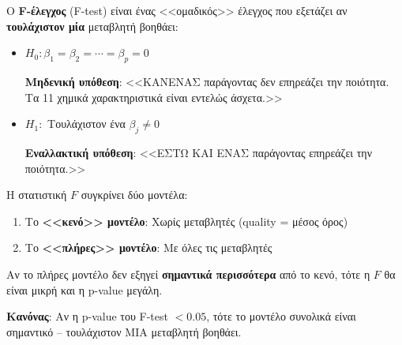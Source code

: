 \documentclass[12pt,a4paper]{article}
\begin{document}
\begin{theorybox}
Ο \textbf{F-έλεγχος} (F-test) είναι ένας <<ομαδικός>> έλεγχος που εξετάζει αν \textbf{τουλάχιστον μία} μεταβλητή βοηθάει:

\begin{itemize}
    \item $H_0: \beta_1 = \beta_2 = \cdots = \beta_p = 0$

    \textbf{Μηδενική υπόθεση}: <<ΚΑΝΕΝΑΣ παράγοντας δεν επηρεάζει την ποιότητα. Τα 11 χημικά χαρακτηριστικά είναι εντελώς άσχετα.>>

    \item $H_1:$ Τουλάχιστον ένα $\beta_j \neq 0$

    \textbf{Εναλλακτική υπόθεση}: <<ΕΣΤΩ ΚΑΙ ΕΝΑΣ παράγοντας επηρεάζει την ποιότητα.>>
\end{itemize}

Η στατιστική $F$ συγκρίνει δύο μοντέλα:
\begin{enumerate}
    \item Το \textbf{<<κενό>> μοντέλο}: Χωρίς μεταβλητές (quality = μέσος όρος)
    \item Το \textbf{<<πλήρες>> μοντέλο}: Με όλες τις μεταβλητές
\end{enumerate}

Αν το πλήρες μοντέλο δεν εξηγεί \textbf{σημαντικά περισσότερα} από το κενό, τότε η $F$ θα είναι μικρή και η p-value μεγάλη.

\textbf{Κανόνας}: Αν η p-value του F-test $< 0.05$, τότε το μοντέλο συνολικά είναι σημαντικό -- τουλάχιστον ΜΙΑ μεταβλητή βοηθάει.
\end{theorybox}
\end{document}
